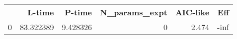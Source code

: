 \begin{tabular}{lrrrrr}
\toprule
{} &     L-time &    P-time &  N\_params\_expt &  AIC-like &  Eff \\
\midrule
0 &  83.322389 &  9.428326 &              0 &     2.474 & -inf \\
\bottomrule
\end{tabular}
